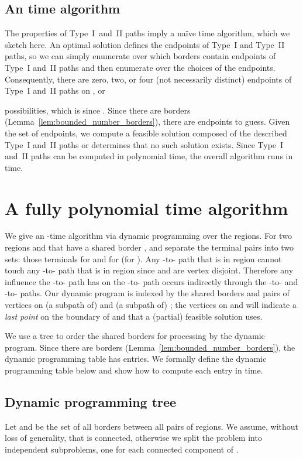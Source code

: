\documentclass[11pt,twoside]{article}
\begin{document}
\subsection{An  time algorithm}

The properties of Type~I~and~II paths imply a na\"ive  time algorithm, which we sketch here.
An optimal solution defines the endpoints of Type~I and Type~II paths, so we can simply enumerate over which borders contain endpoints of Type~I and~II paths and then enumerate over the choices of the endpoints.  
Consequently, there are zero, two, or four (not necessarily distinct) endpoints of Type~I and~II paths on , or

possibilities, which is  since .  Since there are  borders (Lemma~\ref{lem:bounded_number_borders}), there are  endpoints to guess.  Given the set of endpoints, we compute a feasible solution composed of the described Type~I and~II paths or determines that no such solution exists.  Since Type~I and~II paths can be computed in polynomial time, the overall 
algorithm runs in  time.




\section{A fully polynomial time algorithm}

We give an -time algorithm via dynamic programming over the regions.  For two regions  and  that have a shared border ,  and  separate the terminal pairs into two sets: those terminals  for  and  for  (for ).  Any -to- path that is in region  cannot touch any -to- path that is in region  since  and  are vertex disjoint.  Therefore any influence the -to- path has on the -to- path occurs indirectly through the -to- and -to- paths.  Our dynamic program is indexed by the shared borders  and pairs of vertices on (a subpath of)  and (a subpath of) ; the vertices on  and  will indicate a {\em last point} on the boundary of  and  that a (partial) feasible solution uses. 

We use a tree to order the shared borders for processing by the dynamic program. Since there are  borders (Lemma~\ref{lem:bounded_number_borders}), the dynamic programming table has  entries.  We formally define the dynamic programming table below and show how to compute each entry in  time.

\subsection{Dynamic programming tree}
Let  and  be the set of all borders between all pairs of regions.
We assume, without loss of generality, that  is connected, otherwise we  split the problem into independent subproblems, one for each connected component of .
\end{document}
